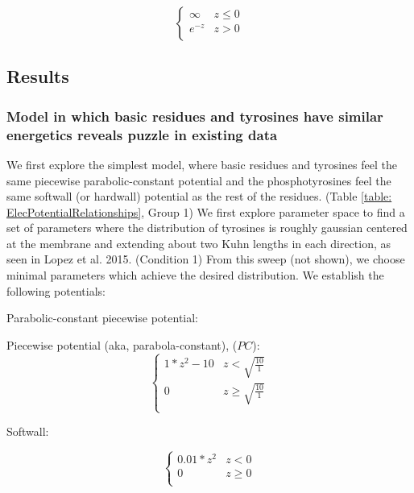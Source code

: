 \documentclass[../../AdvancementSummary.tex]{subfiles}
\begin{document}
\begin{equation}\label{eq: exponential}
\begin{cases}
\infty	& z \leq 0\\
e^{-z} & z > 0 \\
\end{cases}
\end{equation}


\subsection{Results}
\subsubsection{Model in which basic residues and tyrosines have similar energetics reveals puzzle in existing data}

We first explore the simplest model, where basic residues and tyrosines feel the same piecewise parabolic-constant potential and the phosphotyrosines feel the same softwall (or hardwall) potential as the rest of the residues. (Table \ref{table: ElecPotentialRelationships}, Group 1) We first explore parameter space to find a set of parameters where the distribution of tyrosines is roughly gaussian centered at the membrane and extending about two Kuhn lengths in each direction, as seen in Lopez et al. 2015. (Condition 1) From this sweep (not shown), we choose minimal parameters which achieve the desired distribution. We establish the following potentials:


Parabolic-constant piecewise potential:

Piecewise potential (aka, parabola-constant), ($PC$):
\begin{equation}\label{eq: parabolaconstant}
\begin{cases}
1*z^2-10 	& z<\sqrt{\frac{10}{1}}\\
0 & z \geq \sqrt{\frac{10}{1}} \\
\end{cases}
\end{equation}


Softwall:

\begin{equation}\label{eq: softwall}
\begin{cases}
0.01*z^2 	& z < 0\\
0 & z \geq 0 \\
\end{cases}
\end{equation}
\end{document}
